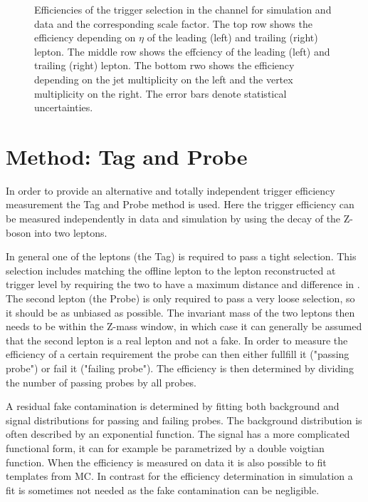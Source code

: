 \begin{figure}[htbp!]
\begin{center}
      \caption{Efficiencies of the trigger selection in the \emu channel for simulation and data and the corresponding scale factor. The top row shows the efficiency depending on $\eta$ of the leading (left) and trailing (right) lepton. The middle row shows the effciency \pt of the leading (left) and trailing (right) lepton. The bottom rwo shows the efficiency depending on the jet multiplicity on the left and the vertex multiplicity on the right.
      The error bars denote statistical uncertainties. }  
      
    \label{fig:MET_emu}
  \end{center}
\end{figure}


\section{Method: Tag and Probe}  %
\label{sec:TriggerTPMethod}

In order to provide an alternative and totally independent trigger efficiency measurement the Tag and Probe method is used.
Here the trigger efficiency can be measured independently in data and simulation by using the decay of the Z-boson into two leptons.

In general one of the leptons (the Tag) is required to pass a tight selection. This selection includes matching the offline lepton to the lepton reconstructed at trigger level by requiring the two to have a maximum distance and difference in \pt. The second lepton (the Probe) is only required to pass a very loose selection, so it should be as unbiased as possible. The invariant mass of the two leptons then needs to be within the Z-mass window, in which case it can generally be assumed that the second lepton is a real lepton and not a fake.
In order to measure the efficiency of a certain requirement the probe can then either fullfill it ("passing probe") or fail it ("failing probe"). The efficiency is then determined by dividing the number of passing probes by all probes.

A residual fake contamination is determined by fitting both background and signal distributions for passing and failing probes. The background distribution is often described by an exponential function. The signal has a more complicated functional form, it can for example be parametrized by a double voigtian function. When the efficiency is measured on data it is also possible to fit templates from MC.
In contrast for the efficiency determination in simulation a fit is sometimes not needed as the fake contamination can be negligible.

